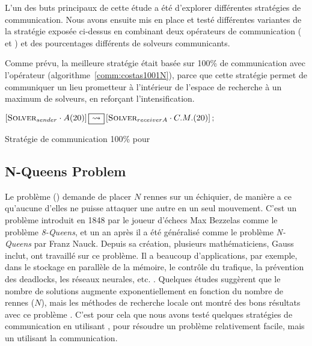 L'un des buts principaux de cette étude a été d'explorer différentes stratégies de communication. Nous avons ensuite mis en place et testé différentes variantes de la stratégie exposée ci-dessus en combinant deux opérateurs de communication (\oneTone{} et \oneTn) et des pourcentages différents de solveurs communicants. 

Comme prévu, la meilleure stratégie était basée sur 100\% de communication avec l'opérateur \oneTn{} (algorithme~\ref{comm:costas1001N}), parce que cette stratégie permet de communiquer un lieu prometteur à l'intérieur de l'espace de recherche à un maximum de solveurs, en refor\c{c}ant l'intensification.

\begin{algorithm}[!h]
\dontprintsemicolon
\SetNoline
$\left[\eqsolverposl{sender}\cdot A(20)\right] \oneton \left[\eqsolverposl{receiverA}\cdot C.M.(20)\right];$
\caption{Stratégie de communication \oneTn{} 100\% pour \CARRP}\label{comm:costas1001N}
\end{algorithm}




\subsection{N-Queens Problem}

Le problème \nq{} (\NQP) demande de placer $N$ rennes sur un échiquier, de manière a ce qu'aucune d'elles ne puisse attaquer une autre en un seul mouvement. C'est un problème introduit en 1848 par le joueur d'échecs Max Bezzelas comme le problème \textit{8-Queens}, et un an après il a été généralisé comme le problème \textit{N-Queens} par Franz Nauck. Depuis sa création, plusieurs mathématiciens, Gauss inclut, ont travaillé sur ce problème. Il a beaucoup d'applications, par exemple, dans le stockage en parallèle de la mémoire, le contrôle du trafique, la prévention des deadlocks, les réseaux neurales, etc. \cite{Bell2009}. Quelques études suggèrent que le nombre de solutions augmente exponentiellement en fonction du nombre de rennes ($N$), mais les méthodes de recherche locale ont montré des bons résultats avec ce problème \cite{Sosic1994}. C'est pour cela que nous avons testé quelques stratégies de communication en utilisant \posl{}, pour résoudre un problème relativement facile, mais un utilisant la communication.


